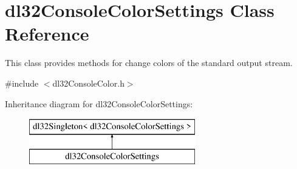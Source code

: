 \hypertarget{classdl32_console_color_settings}{\section{dl32\-Console\-Color\-Settings Class Reference}
\label{classdl32_console_color_settings}
}


This class provides methods for change colors of the standard output stream.  




{\ttfamily \#include $<$dl32\-Console\-Color.\-h$>$}

Inheritance diagram for dl32\-Console\-Color\-Settings\-:\begin{figure}[H]
\begin{center}
\leavevmode
\includegraphics[height=2.000000cm]{classdl32_console_color_settings}
\end{center}
\end{figure}
